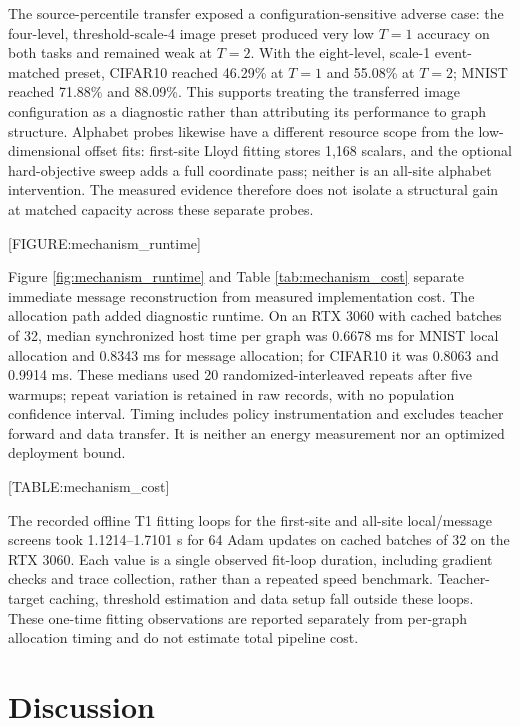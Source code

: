 \documentclass{article}
\begin{document}
\label{sec:source_adaptation_and_diagnostic_cost}

The source-percentile transfer exposed a configuration-sensitive adverse case: the four-level, threshold-scale-4 image preset produced very low $T=1$ accuracy on both tasks and remained weak at $T=2$. With the eight-level, scale-1 event-matched preset, CIFAR10 reached 46.29\% at $T=1$ and 55.08\% at $T=2$; MNIST reached 71.88\% and 88.09\%. This supports treating the transferred image configuration as a diagnostic rather than attributing its performance to graph structure. Alphabet probes likewise have a different resource scope from the low-dimensional offset fits: first-site Lloyd fitting stores 1,168 scalars, and the optional hard-objective sweep adds a full coordinate pass; neither is an all-site alphabet intervention. The measured evidence therefore does not isolate a structural gain at matched capacity across these separate probes.

[FIGURE:mechanism\_runtime]

Figure \ref{fig:mechanism_runtime} and Table \ref{tab:mechanism_cost} separate immediate message reconstruction from measured implementation cost. The allocation path added diagnostic runtime. On an RTX 3060 with cached batches of 32, median synchronized host time per graph was 0.6678 ms for MNIST local allocation and 0.8343 ms for message allocation; for CIFAR10 it was 0.8063 and 0.9914 ms. These medians used 20 randomized-interleaved repeats after five warmups; repeat variation is retained in raw records, with no population confidence interval. Timing includes policy instrumentation and excludes teacher forward and data transfer. It is neither an energy measurement nor an optimized deployment bound.

[TABLE:mechanism\_cost]

The recorded offline T1 fitting loops for the first-site and all-site local/message screens took 1.1214--1.7101 s for 64 Adam updates on cached batches of 32 on the RTX 3060. Each value is a single observed fit-loop duration, including gradient checks and trace collection, rather than a repeated speed benchmark. Teacher-target caching, threshold estimation and data setup fall outside these loops. These one-time fitting observations are reported separately from per-graph allocation timing and do not estimate total pipeline cost.

\section{Discussion}
\end{document}
